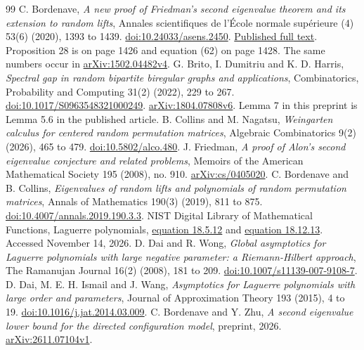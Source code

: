 \documentclass[11pt]{article}
\theoremstyle{definition}
\theoremstyle{remark}
\newcommand{\1}{\mathbf 1}
\begin{document}
\begin{thebibliography}{99}
C. Bordenave, \emph{A new proof of Friedman's second eigenvalue theorem and its extension to random lifts}, Annales scientifiques de l'\'Ecole normale sup\'erieure (4) 53(6) (2020), 1393 to 1439.
\href{https://doi.org/10.24033/asens.2450}{doi:10.24033/asens.2450}.
\href{https://smf.emath.fr/download/pdf/1498332}{Published full text}. Proposition 28 is on page 1426 and equation (62) on page 1428. The same numbers occur in \href{https://arxiv.org/abs/1502.04482v4}{arXiv:1502.04482v4}.
G. Brito, I. Dumitriu and K. D. Harris, \emph{Spectral gap in random bipartite biregular graphs and applications}, Combinatorics, Probability and Computing 31(2) (2022), 229 to 267.
\href{https://doi.org/10.1017/S0963548321000249}{doi:10.1017/S0963548321000249}.
\href{https://arxiv.org/abs/1804.07808v6}{arXiv:1804.07808v6}. Lemma 7 in this preprint is Lemma 5.6 in the published article.
B. Collins and M. Nagatsu, \emph{Weingarten calculus for centered random permutation matrices}, Algebraic Combinatorics 9(2) (2026), 465 to 479.
\href{https://doi.org/10.5802/alco.480}{doi:10.5802/alco.480}.
J. Friedman, \emph{A proof of Alon's second eigenvalue conjecture and related problems}, Memoirs of the American Mathematical Society 195 (2008), no. 910.
\href{https://arxiv.org/abs/cs/0405020}{arXiv:cs/0405020}.
C. Bordenave and B. Collins, \emph{Eigenvalues of random lifts and polynomials of random permutation matrices}, Annals of Mathematics 190(3) (2019), 811 to 875.
\href{https://doi.org/10.4007/annals.2019.190.3.3}{doi:10.4007/annals.2019.190.3.3}.
NIST Digital Library of Mathematical Functions, Laguerre polynomials,
\href{https://dlmf.nist.gov/18.5.E12}{equation 18.5.12} and
\href{https://dlmf.nist.gov/18.12.E13}{equation 18.12.13}. Accessed November 14, 2026.
D. Dai and R. Wong, \emph{Global asymptotics for Laguerre polynomials with large negative parameter: a Riemann-Hilbert approach}, The Ramanujan Journal 16(2) (2008), 181 to 209.
\href{https://doi.org/10.1007/s11139-007-9108-7}{doi:10.1007/s11139-007-9108-7}.
D. Dai, M. E. H. Ismail and J. Wang, \emph{Asymptotics for Laguerre polynomials with large order and parameters}, Journal of Approximation Theory 193 (2015), 4 to 19.
\href{https://doi.org/10.1016/j.jat.2014.03.009}{doi:10.1016/j.jat.2014.03.009}.
C. Bordenave and Y. Zhu, \emph{A second eigenvalue lower bound for the directed configuration model}, preprint, 2026.
\href{https://arxiv.org/abs/2611.07104v1}{arXiv:2611.07104v1}.

\end{thebibliography}
\end{document}
